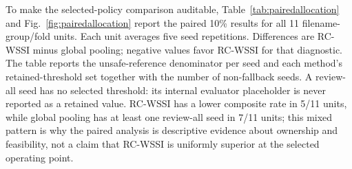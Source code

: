 \documentclass[iicol,pdflatex,sn-mathphys-num]{sn-jnl}
\begin{document}
To make the selected-policy comparison auditable, Table~\ref{tab:pairedallocation} and Fig.~\ref{fig:pairedallocation} report the paired 10\% results for all 11 filename-group/fold units. Each unit averages five seed repetitions. Differences are RC-WSSI minus global pooling; negative values favor RC-WSSI for that diagnostic. The table reports the unsafe-reference denominator per seed and each method's retained-threshold set together with the number of non-fallback seeds. A review-all seed has no selected threshold: its internal evaluator placeholder is never reported as a retained value. RC-WSSI has a lower composite rate in 5/11 units, while global pooling has at least one review-all seed in 7/11 units; this mixed pattern is why the paired analysis is descriptive evidence about ownership and feasibility, not a claim that RC-WSSI is uniformly superior at the selected operating point.
\end{document}
